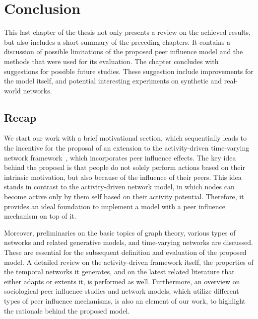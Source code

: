 \chapter{Conclusion}
\label{cha:conclusion}

This last chapter of the thesis not only presents a review on the achieved results, but also includes a short summary of the preceding chapters.
It contains a discussion of possible limitations of the proposed peer influence model and the methods that were used for its evaluation.
The chapter concludes with suggestions for possible future studies.
These suggestion include improvements for the model itself, and potential interesting experiments on synthetic and real-world networks.




\section{Recap}
\label{sec:recap}

We start our work with a brief motivational section, which sequentially leads to the incentive for the proposal of an extension to the activity-driven time-varying network framework~\cite{Perra2012a}, which incorporates peer influence effects.
The key idea behind the proposal is that people do not solely perform actions based on their intrinsic motivation, but also because of the influence of their peers.
This idea stands in contrast to the activity-driven network model, in which nodes can become active only by them self based on their activity potential.
Therefore, it provides an ideal foundation to implement a model with a peer influence mechanism on top of it.

Moreover, preliminaries on the basic topics of graph theory, various types of networks and related generative models, and time-varying networks are discussed.
These are essential for the subsequent definition and evaluation of the proposed model.
A detailed review on the activity-driven framework itself, the properties of the temporal networks it generates, and on the latest related literature that either adapts or extents it, is performed as well.
Furthermore, an overview on sociological peer influence studies and network models, which utilize different types of peer influence mechanisms, is also an element of our work, to highlight the rationale behind the proposed model.

